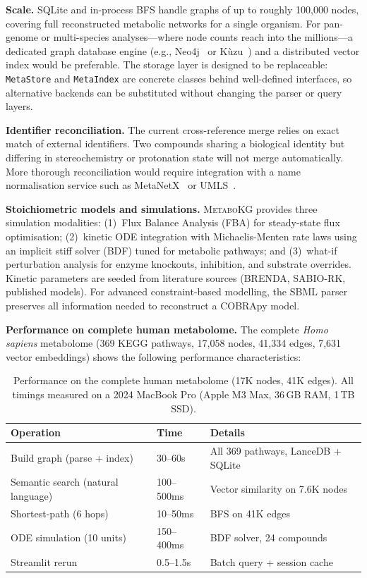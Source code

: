 \documentclass[10pt]{article}
\begin{document}
\textbf{Scale.} SQLite and in-process BFS handle graphs of up to roughly
100,000 nodes, covering full reconstructed metabolic networks for a single
organism. For pan-genome or multi-species analyses---where node counts reach
into the millions---a dedicated graph database engine (e.g.,
Neo4j~\citep{neo4j2020} or K\`uzu~\citep{feng2023kuzu}) and a distributed
vector index would be preferable. The storage layer is designed to be
replaceable: \texttt{MetaStore} and \texttt{MetaIndex} are concrete classes
behind well-defined interfaces, so alternative backends can be substituted
without changing the parser or query layers.

\textbf{Identifier reconciliation.} The current cross-reference merge relies
on exact match of external identifiers. Two compounds sharing a biological
identity but differing in stereochemistry or protonation state will not merge
automatically. More thorough reconciliation would require integration with a
name normalisation service such as
MetaNetX~\citep{moretti2021metanetx} or UMLS~\citep{bodenreider2004umls}.

\textbf{Stoichiometric models and simulations.} \textsc{MetaboKG} provides
three simulation modalities: (1)~Flux Balance Analysis (FBA) for steady-state
flux optimisation; (2)~kinetic ODE integration with Michaelis-Menten rate laws
using an implicit stiff solver (BDF) tuned for metabolic pathways; and
(3)~what-if perturbation analysis for enzyme knockouts, inhibition, and
substrate overrides. Kinetic parameters are seeded from literature sources
(BRENDA, SABIO-RK, published models). For advanced constraint-based modelling,
the SBML parser preserves all information needed to reconstruct a COBRApy
model.

\textbf{Performance on complete human metabolome.} The complete
\textit{Homo sapiens} metabolome (369 KEGG pathways, 17,058 nodes, 41,334
edges, 7,631 vector embeddings) shows the following performance
characteristics:

\begin{table}[H]
  \centering
  \caption{Performance on the complete human metabolome (17K nodes, 41K edges).
  All timings measured on a 2024 MacBook Pro (Apple M3 Max, 36\,GB RAM, 1\,TB SSD).}
  \label{tab:performance}
  \small
  \begin{tabular}{@{}lll@{}}
    \toprule
    Operation & Time & Details \\
    \midrule
    Build graph (parse + index) & 30--60s & All 369 pathways, LanceDB + SQLite \\
    Semantic search (natural language) & 100--500ms & Vector similarity on 7.6K nodes \\
    Shortest-path (6 hops) & 10--50ms & BFS on 41K edges \\
    ODE simulation (10 units) & 150--400ms & BDF solver, 24 compounds \\
    Streamlit rerun & 0.5--1.5s & Batch query + session cache \\
    \bottomrule
  \end{tabular}
\end{table}
\end{document}
